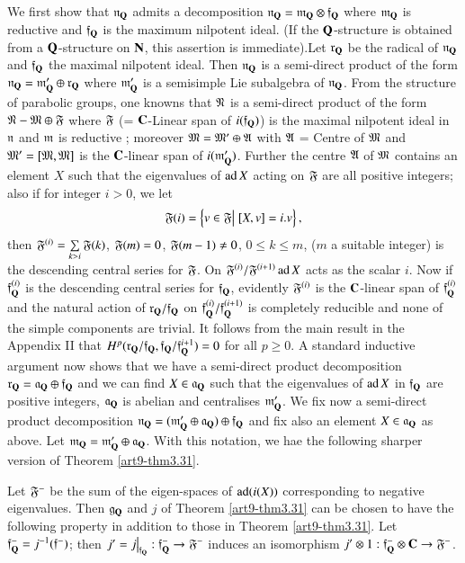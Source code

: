 \subsection{}\label{art9-subsec3.32}
We first show that $\mathfrak{n}_{\mathbf{Q}}$ admits a decomposition $\mathfrak{n}_{\mathbf{Q}} = \mathfrak{m}_{\mathbf{Q}} \otimes \mathfrak{f}_{\mathbf{Q}}$ where $\mathfrak{m}_{\mathbf{Q}}$ is reductive and $\mathfrak{f}_{\mathbf{Q}}$ is the maximum nilpotent ideal. (If the $\mathbf{Q}$-structure is obtained from a $\mathbf{Q}$-structure on $\mathbf{N}$, this assertion is immediate).\pageoriginale Let $\mathfrak{r}_{\mathbf{Q}}$ be the radical of $\mathfrak{n}_{\mathbf{Q}}$ and $\mathfrak{f}_{\mathbf{Q}}$ the maximal nilpotent ideal. Then $\mathfrak{n}_{\mathbf{Q}}$ is a semi-direct product of the form $\mathfrak{n}_{\mathbf{Q}} = \mathfrak{m}'_{\mathbf{Q}} \oplus \mathfrak{r}_{\mathbf{Q}}$ where $\mathfrak{m}'_{\mathbf{Q}}$ is a semisimple Lie subalgebra of $\mathfrak{n}_{\mathbf{Q}}$. From the structure of parabolic groups, one knowns that $\mathfrak{N}$ is a semi-direct product of the form $\mathfrak{N}-\mathfrak{M} \oplus \mathfrak{F}$ where $\mathfrak{F} $ (= $\mathbf{C}$-Linear span of $i(\mathfrak{f}_{\mathbf{Q}})$) is the maximal nilpotent ideal in $\mathfrak{n}$ and $\mathfrak{m}$ is reductive ; moreover $\mathfrak{M}= \mathfrak{M}' \oplus \mathfrak{A}$ with  $\mathfrak{A}$ = Centre of $\mathfrak{M}$ and $\mathfrak{M}' = [\mathfrak{M}, \mathfrak{M}]$ is the $\mathbf{C}$-linear span of $i (\mathfrak{m}'_{\mathbf{Q}})$. Further the centre $\mathfrak{A}$ of $\mathfrak{M}$ contains an element $X$ such that the eigenvalues of $\operatorname{ad} X$ acting on $\mathfrak{F}$ are all positive integers; also if for integer $i >0$, we let
$$
\mathfrak{F} (i) = \left\{v \in \mathfrak{F} \big| \;[X, v] = i. v \right\},
$$
then $\mathfrak{F}^{(i)} = \sum\limits_{k> i} \mathfrak{F} (k)$, $\mathfrak{F} (m) = 0$, $\mathfrak{F} (m-1) \neq 0$, $0 \leqslant k \leqslant m$, ($m$ a suitable integer) is the descending central series for $\mathfrak{F}$. On $\mathfrak{F}^{(i)}/ \mathfrak{F}^{(i+1)} \operatorname{ad} X$ acts as the scalar $i$. Now if $\mathfrak{f}^{(i)}_{\mathbf{Q}}$ is the descending central series for $\mathfrak{f}_{\mathbf{Q}}$, evidently $\mathfrak{F}^{(i)}$ is the $\mathbf{C}$-linear span of $\mathfrak{f}^{(i)}_{\mathbf{Q}}$ and the natural action of $\mathfrak{r}_{\mathbf{Q}} / \mathfrak{f}_{\mathbf{Q}}$ on $\mathfrak{f}^{(i)}_{\mathbf{Q}} / \mathfrak{f}^{(i+1)}_{\mathbf{Q}}$ is completely reducible and none of the simple components are trivial. It follows from the main result in the Appendix II that $H^p (\mathfrak{r}_{\mathbf{Q}} / \mathfrak{f}_{\mathbf{Q}}, \mathfrak{f}_{\mathbf{Q}} / \mathfrak{f}_{\mathbf{Q}}^{i+1}) =0$ for all $p \geqslant 0$. A standard inductive argument now shows that we have a semi-direct product decomposition $\mathfrak{r}_{\mathbf{Q}} = \mathfrak{a}_{\mathbf{Q}} \oplus \mathfrak{f}_{\mathbf{Q}}$ and we can find $X \in \mathfrak{a}_{\mathbf{Q}}$ such that the eigenvalues of $\operatorname{ad} X$ in $\mathfrak{f}_{\mathbf{Q}}$ are positive integers, $\mathfrak{a}_{\mathbf{Q}}$ is abelian and centralises $\mathfrak{m}'_{\mathbf{Q}}$. We fix now a semi-direct product decomposition $\mathfrak{n}_{\mathbf{Q}} = (\mathfrak{m}'_{\mathbf{Q}} \oplus \mathfrak{a}_{\mathbf{Q}}) \oplus\mathfrak{f}_{\mathbf{Q}}$ and fix also an element $X \in \mathfrak{a}_{\mathbf{Q}}$ as above. Let $\mathfrak{m}_{\mathbf{Q}} = \mathfrak{m}'_{\mathbf{Q}} \oplus \mathfrak{a}_{\mathbf{Q}}$. With this notation, we hae the following sharper version of Theorem \ref{art9-thm3.31}.

\setcounter{definition}{32}
\begin{theorem}\label{art9-thm3.33}
Let $\mathfrak{F}^-$ be the sum of the eigen-spaces of $\operatorname{ad} (i(X))$ corresponding to negative eigenvalues. Then $\mathfrak{g}_{\mathbf{Q}}$ and $j$ of Theorem \ref{art9-thm3.31} can be chosen to have the following property in addition to those in Theorem \ref{art9-thm3.31}. Let $\mathfrak{f}^-_{\mathbf{Q}} = j^{-1} (\mathfrak{f}^-)$; then $j' = j \big|_{\mathfrak{f}_{\mathbf{Q}}} : \mathfrak{f}^-_{\mathbf{Q}} \to \mathfrak{F}^-$ induces an isomorphism $j' \otimes 1: \mathfrak{f}^-_{\mathbf{Q}} \otimes \mathbf{C} \to \mathfrak{F}^-$.
\end{theorem}

